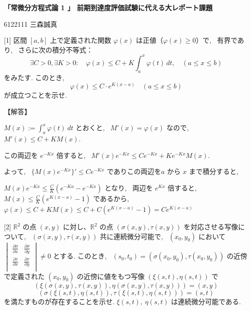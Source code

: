 \documentclass{jsarticle}
\begin{document}
\textbf{「常微分方程式論 1 」 前期到達度評価試験に代える大レポート課題}

\begin{flushright}
6122111 三森誠真
\end{flushright}


\begin{itembox}[l]{[1]}
区間 $[a, b]$ 上で定義された関数 $\varphi(x)$ は正値（$\varphi(x) \geq 0$）で, \ 有界であり, \ さらに次の積分不等式：
    \[
    \exists C > 0, \exists K > 0: \quad \varphi(x) \leq C + K \int_a^x \varphi(t) \, dt, \quad (a \leq x \leq b)
    \]
    をみたす. このとき, \ 
    \[
    \varphi(x) \leq C \cdot e^{K(x-a)} \quad (a \leq x \leq b)
    \]
    が成立つことを示せ.
\end{itembox}

【解答】

$M(x) := \displaystyle \int_a^x \varphi(t) \ dt$ とおくと, \ $M'(x) = \varphi(x)$ なので, \ $M'(x) \leq C + KM(x)$. 

この両辺を $e^{-Kx}$ 倍すると, \ $M'(x)e^{-Kx} \leq Ce^{-Kx} + Ke^{-Kx}M(x)$.

よって, \ $\{M(x)e^{-Kx} \}' \leq Ce^{-Kx}$ でありこの両辺を$a$ から $x$ まで積分すると, \ 

$M(x)e^{-Kx} \leq \displaystyle \frac{C}{K} (e^{-Ka} - e^{-Kx})$ となり, \ 
両辺を $e^{Kx}$ 倍すると, 
$M(x) \leq \displaystyle \frac{C}{K} (e^{K(x-a)} - 1)$ であるから, \ $\varphi(x) \leq C + KM(x) 
\leq C + C(e^{K(x-a)} - 1) 
= Ce^{K(x-a)}$


\bigskip
\bigskip

\begin{itembox}[l]{[2]}
$\mathbb{R}^2$ の点 $(x, y)$ に対し、$\mathbb{R}^2$ の点 $(\sigma(x, y), \tau(x, y))$ を対応させる写像について, \ $(\sigma(x, y), \tau(x, y))$ 共に連続微分可能で, \ $(x_0, y_0)$ において
$\begin{vmatrix}
\frac{\partial \sigma}{\partial x} & \frac{\partial \sigma}{\partial y} \\
\frac{\partial \tau}{\partial x} & \frac{\partial \tau}{\partial y} \\
\end{vmatrix} \neq 0
$
とする. このとき, \ $(s_0, t_0) = (\sigma(x_0, y_0), \tau(x_0, y_0))$ の近傍で定義された $(x_0, y_0)$ の近傍に値をもつ写像 $(\xi(s, t), \eta(s, t))$ で
$$
(\xi(\sigma(x,y), \tau(x,y)), \eta(\sigma(x,y), \tau(x,y))) = (x,y)
$$
\vspace{-2zw}
$$
(\sigma(\xi(s,t), \eta(s,t)), \tau(\xi(s,t), \eta(s,t))) = (s,t)
$$
を満たすものが存在することを示せ. $\xi(s,t), \ \eta(s, t)$ は連続微分可能である.
\end{itembox}
\end{document}

